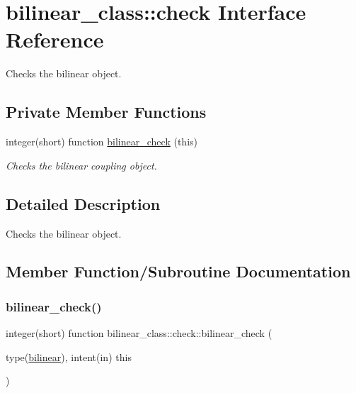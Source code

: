 \hypertarget{interfacebilinear__class_1_1check}{}\section{bilinear\+\_\+class\+:\+:check Interface Reference}
\label{interfacebilinear__class_1_1check}


Checks the bilinear object.  


\subsection*{Private Member Functions}
\begin{DoxyCompactItemize}
\item 
integer(short) function \hyperlink{interfacebilinear__class_1_1check_a2f5e2ad8486524baf370c82792c889a6}{bilinear\+\_\+check} (this)
\begin{DoxyCompactList}\small\item\em Checks the bilinear coupling object. \end{DoxyCompactList}\end{DoxyCompactItemize}


\subsection{Detailed Description}
Checks the bilinear object. 

\subsection{Member Function/\+Subroutine Documentation}
\mbox{\label{interfacebilinear__class_1_1check_a2f5e2ad8486524baf370c82792c889a6}} 
\subsubsection{\texorpdfstring{bilinear\+\_\+check()}{bilinear\_check()}}
{\footnotesize\ttfamily integer(short) function bilinear\+\_\+class\+::check\+::bilinear\+\_\+check (\begin{DoxyParamCaption}\item[{type(\hyperlink{structbilinear__class_1_1bilinear}{bilinear}), intent(in)}]{this }\end{DoxyParamCaption})\hspace{0.3cm}{\ttfamily [private]}}



